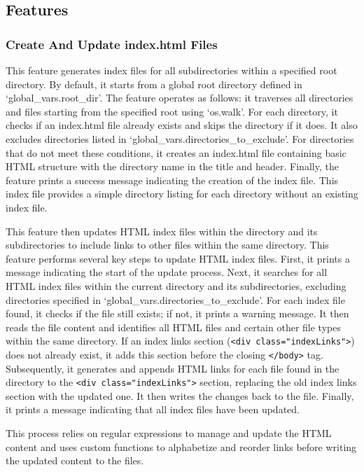 \subsection{Features}

\subsubsection{Create And Update index.html Files}

This feature generates index files for all subdirectories within a specified root directory. By default, it starts from a global root directory defined in `global\_vars.root\_dir'. The feature operates as follows: it traverses all directories and files starting from the specified root using `os.walk'. For each directory, it checks if an index.html file already exists and skips the directory if it does. It also excludes directories listed in `global\_vars.directories\_to\_exclude'. For directories that do not meet these conditions, it creates an index.html file containing basic HTML structure with the directory name in the title and header. Finally, the feature prints a success message indicating the creation of the index file. This index file provides a simple directory listing for each directory without an existing index file.

This feature then updates HTML index files within the directory and its subdirectories to include links to other files within the same directory. This feature performs several key steps to update HTML index files. First, it prints a message indicating the start of the update process. Next, it searches for all HTML index files within the current directory and its subdirectories, excluding directories specified in `global\_vars.directories\_to\_exclude'. For each index file found, it checks if the file still exists; if not, it prints a warning message. It then reads the file content and identifies all HTML files and certain other file types within the same directory. If an index links section (\texttt{<div class="indexLinks">}) does not already exist, it adds this section before the closing \texttt{</body>} tag. Subsequently, it generates and appends HTML links for each file found in the directory to the \texttt{<div class="indexLinks">} section, replacing the old index links section with the updated one. It then writes the changes back to the file. Finally, it prints a message indicating that all index files have been updated.

This process relies on regular expressions to manage and update the HTML content and uses custom functions to alphabetize and reorder links before writing the updated content to the files.

